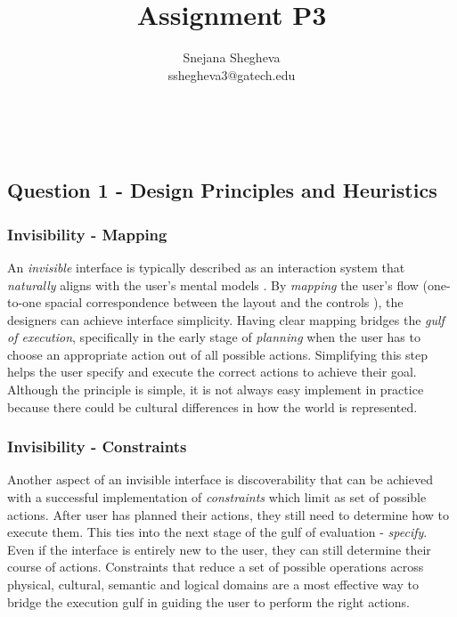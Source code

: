\documentclass[12pt,letterpaper]{article}
\makeatletter
\renewcommand{\maketitle}{\bgroup
   \begin{center}
   \textbf{{\fontsize{18pt}{20}\selectfont \@title}}\\
   \vspace{10pt}
   {\fontsize{12pt}{0}\selectfont \@author} 
   \end{center}
}
\makeatother
\begin{document}
\title{Assignment P3}
\author{Snejana Shegheva \\ sshegheva3@gatech.edu}

\maketitle
\thispagestyle{fancy}

\subsection*{Question 1 - Design Principles and Heuristics}

\subsubsection*{Invisibility - Mapping}

An \textit{invisible} interface is typically described as an interaction system that \textit{naturally} aligns with the user's mental models \cite{blog:fastcompany}. By \textit{mapping} the user's flow (one-to-one spacial correspondence between the layout and the controls \cite{norman2013design}), the designers can achieve interface simplicity. Having clear mapping bridges the \textit{gulf of execution}, specifically in the early stage of \textit{planning} when the user has to choose an appropriate action out of all possible actions. Simplifying this step helps the user specify and execute the correct actions to achieve their goal. Although the principle is simple, it is not always easy implement in practice because there could be cultural differences in how the world is represented.  

\subsubsection*{Invisibility - Constraints}
Another aspect of an invisible interface is discoverability that can be achieved with a successful implementation of \textit{constraints} which limit as set of possible actions. After user has planned their actions, they still need to determine how to execute them. This ties into the next stage of the gulf of evaluation - \textit{specify}. Even if the interface is entirely new to the user, they can still determine their course of actions. Constraints that reduce a set of possible operations across physical, cultural, semantic and logical domains are a most effective way to bridge the execution gulf in guiding the user to perform the right actions.
\end{document}

